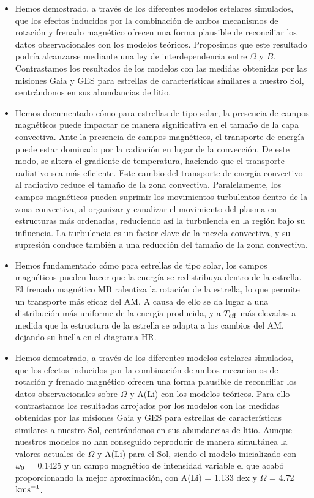 \begin{itemize}
    \item Hemos demostrado, a través de los diferentes modelos estelares simulados, que los efectos inducidos por la combinación de ambos mecanismos de rotación y frenado magnético ofrecen una forma plausible de reconciliar los datos observacionales con los modelos teóricos. Proposimos que este resultado podría alcanzarse mediante una ley de interdependencia entre $\Omega$ y $B$. Contrastamos los resultados de los modelos con las medidas obtenidas por las misiones Gaia y GES para estrellas de características similares a nuestro Sol, centrándonos en sus abundancias de litio.
    \item Hemos documentado cómo para estrellas de tipo solar, la presencia de campos magnéticos puede impactar de manera significativa en el tamaño de la capa convectiva. Ante la presencia de campos magnéticos, el transporte de energía puede estar dominado por la radiación en lugar de la convección. De este modo, se altera el gradiente de temperatura, haciendo que el transporte radiativo sea más eficiente. Este cambio del transporte de energía convectivo al radiativo reduce el tamaño de la zona convectiva. Paralelamente, los campos magnéticos pueden suprimir los movimientos turbulentos dentro de la zona convectiva, al organizar y canalizar el movimiento del plasma en estructuras más ordenadas, reduciendo así la turbulencia en la región bajo su influencia. La turbulencia es un factor clave de la mezcla convectiva, y su supresión conduce también a una reducción del tamaño de la zona convectiva.
    \item Hemos fundamentado cómo para estrellas de tipo solar, los campos magnéticos pueden hacer que la energía se redistribuya dentro de la estrella. El frenado magnético MB ralentiza la rotación de la estrella, lo que permite un transporte más eficaz del AM. A causa de ello se da lugar a una distribución más uniforme de la energía producida, y a $T_{\mathrm{eff}}$ más elevadas a medida que la estructura de la estrella se adapta a los cambios del AM, dejando su huella en el diagrama HR.
    \item Hemos demostrado, a través de los diferentes modelos estelares simulados, que los efectos inducidos por la combinación de ambos mecanismos de rotación y frenado magnético ofrecen una forma plausible de reconciliar los datos observacionales sobre $\Omega$ y A(Li)  con los modelos teóricos. Para ello contrastamos los resultados arrojados por los modelos con las medidas obtenidas por las misiones Gaia y GES para estrellas de características similares a nuestro Sol, centrándonos en sus abundancias de litio. Aunque nuestros modelos no han conseguido reproducir de manera simultánea la valores actuales de $\Omega$ y A(Li) para el Sol, siendo el modelo inicializado con $\omega_{\mathrm{0}}$ = 0.1425 y un campo magnético de intensidad variable el que acabó proporcionando la mejor aproximación, con A(Li) = 1.133 dex y $\Omega$ = 4.72 $\mathrm{kms}^{-1}$.

\end{itemize}
